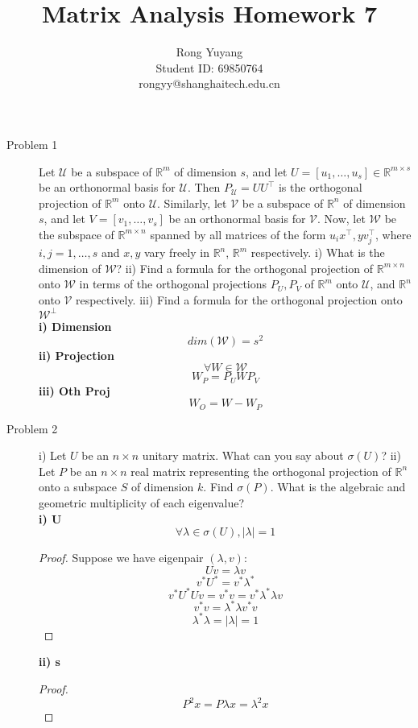 \documentclass{article}
\title{Matrix Analysis Homework 7}
\author{Rong Yuyang \\ Student ID: 69850764 \\ rongyy@shanghaitech.edu.cn}
\begin{document}
\maketitle

\begin{description}
	\item[Problem 1] Let $\mathcal{U}$ be a subspace of $\mathbb{R}^{m}$ of dimension $s$, and let $U=[u_1,\dots,u_s]\in\mathbb{R}^{m\times s}$ be an orthonormal basis for $\mathcal{U}$. Then $P_{\mathcal{U}} = U U^\top$ is the orthogonal projection of $\mathbb{R}^{m}$ onto $\mathcal{U}$. Similarly, let $\mathcal{V}$ be a subspace of $\mathbb{R}^{n}$ of dimension $s$, and let $V=[v_1,\dots,v_s]$ be an orthonormal basis for $\mathcal{V}$. Now, let $\mathcal{W}$ be the subspace of $\mathbb{R}^{m\times n}$ spanned by all matrices of the form $u_i x^\top, y v_j^\top$, where $i,j=1,\dots,s$ and $x,y$ vary freely in $\mathbb{R}^{n}$, $\mathbb{R}^{m}$ respectively. i) What is the dimension of $\mathcal{W}$? ii) Find a formula for the orthogonal projection of $\mathbb{R}^{m\times n}$ onto $\mathcal{W}$ in terms of the orthogonal projections $P_U,P_V$ of $\mathbb{R}^{m}$ onto $\mathcal{U}$, and $\mathbb{R}^{n}$ onto $\mathcal{V}$ respectively. iii) Find a formula for the orthogonal projection onto $\mathcal{W}^\perp$ \\
	\textbf{i) Dimension}
		$$dim(\mathcal{W}) = s^2$$
	\textbf{ii) Projection}
		$$\forall W \in \mathcal{W}$$
		$$W_P = P_UWP_V$$
	\textbf{iii) Oth Proj}
		$$W_O = W - W_P$$

	\item[Problem 2] i) Let $U$ be an $n \times n$ unitary matrix. What can you say about $\sigma(U)$? ii) Let $P$ be an $n \times n$ real matrix representing the orthogonal projection of $\mathbb{R}^{n}$ onto a subspace $S$ of dimension $k$. Find $\sigma(P)$. What is the algebraic and geometric multiplicity of each eigenvalue? \\
	\textbf{i) U}
	$$\forall \lambda \in \sigma(U), |\lambda| = 1$$
	\begin{proof}
		Suppose we have eigenpair $(\lambda, v)$:
		$$ Uv = \lambda v$$
		$$ v^*U^* = v^*\lambda^*$$
		$$ v^*U^* Uv = v^*v = v^*\lambda^*\lambda v$$
		$$ v^*v = \lambda^*\lambda v^*v$$
		$$ \lambda^*\lambda = |\lambda| = 1$$
	\end{proof}
	\textbf{ii) s}
	\begin{proof}
		$$P^2x = P\lambda x = \lambda^2 x$$
	\end{proof}

\end{description}
\end{document}
